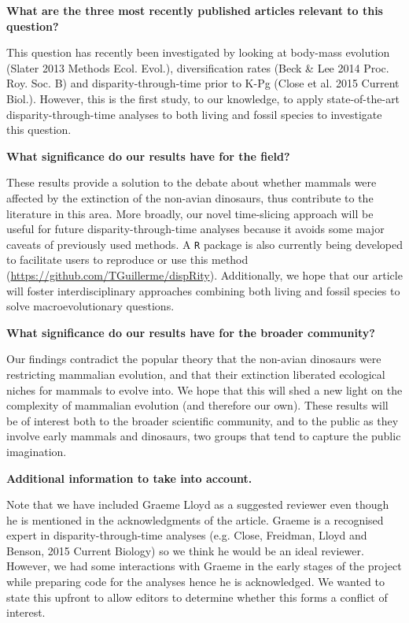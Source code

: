\documentclass[11pt]{letter}
\begin{document}
\begin{letter}{}
\textbf{What are the three most recently published articles relevant to this question?}

This question has recently been investigated by looking at body-mass evolution (Slater 2013 Methods Ecol. Evol.), diversification rates (Beck \& Lee 2014 Proc. Roy. Soc. B) and disparity-through-time prior to K-Pg (Close et al. 2015 Current Biol.).
However, this is the first study, to our knowledge, to apply state-of-the-art disparity-through-time analyses to both living and fossil species to investigate this question.

\textbf{What significance do our results have for the field?}

These results provide a solution to the debate about whether mammals were affected by the extinction of the non-avian dinosaurs, thus contribute to the literature in this area.
More broadly, our novel time-slicing approach will be useful for future disparity-through-time analyses because it avoids some major caveats of previously used methods.
A \texttt{R} package is also currently being developed to facilitate users to reproduce or use this method (\url{https://github.com/TGuillerme/dispRity}).
Additionally, we hope that our article will foster interdisciplinary approaches combining both living and fossil species to solve macroevolutionary questions.

\textbf{What significance do our results have for the broader community?}

Our findings contradict the popular theory that the non-avian dinosaurs were restricting mammalian evolution, and that their extinction liberated ecological niches for mammals to evolve into.
We hope that this will shed a new light on the complexity of mammalian evolution (and therefore our own).
These results will be of interest both to the broader scientific community, and to the public as they involve early mammals and dinosaurs, two groups that tend to capture the public imagination.

\textbf{Additional information to take into account.}

Note that we have included Graeme Lloyd as a suggested reviewer even though he is mentioned in the acknowledgments of the article.
Graeme is a recognised expert in disparity-through-time analyses (e.g. Close, Freidman, Lloyd and Benson, 2015 Current Biology) so we think he would be an ideal reviewer.
However, we had some interactions with Graeme in the early stages of the project while preparing code for the analyses hence he is acknowledged.
We wanted to state this upfront to allow editors to determine whether this forms a conflict of interest.


\end{letter}
\end{document}

